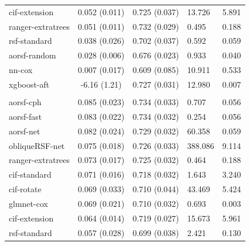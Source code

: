 \documentclass[twoside,11pt]{article}\usepackage[]{graphicx}\usepackage[]{xcolor}
\newenvironment{knitrout}{}{} %
\begin{document}
\begin{knitrout}
\begin{longtable}[t]{lcclc}
\hspace{1em}cif-extension & 0.052 (0.011) & 0.725 (0.037) & 13.726 & 5.891\\
\hspace{1em}ranger-extratrees & 0.051 (0.011) & 0.732 (0.029) & 0.495 & 0.188\\
\hspace{1em}rsf-standard & 0.038 (0.026) & 0.702 (0.037) & 0.592 & 0.059\\
\hspace{1em}aorsf-random & 0.028 (0.006) & 0.676 (0.023) & 0.933 & 0.040\\
\hspace{1em}nn-cox & 0.007 (0.017) & 0.609 (0.085) & 10.911 & 0.533\\
\hspace{1em}xgboost-aft & -6.16 (1.21) & 0.727 (0.031) & 12.980 & 0.007\\
\addlinespace[0.3em]
\hline
\multicolumn{5}{l}{\textit{\textbf{GUIDE-IT; HF hospitalization, n = 894, p = 59}}}\\
\hline
\hspace{1em}aorsf-cph & 0.085 (0.023) & 0.734 (0.033) & 0.707 & 0.056\\
\hspace{1em}aorsf-fast & 0.083 (0.022) & 0.734 (0.032) & 0.254 & 0.056\\
\hspace{1em}aorsf-net & 0.082 (0.024) & 0.729 (0.032) & 60.358 & 0.059\\
\hspace{1em}obliqueRSF-net & 0.075 (0.018) & 0.726 (0.033) & 388.086 & 9.114\\
\hspace{1em}ranger-extratrees & 0.073 (0.017) & 0.725 (0.032) & 0.464 & 0.188\\
\hspace{1em}cif-standard & 0.071 (0.016) & 0.718 (0.032) & 1.643 & 3.240\\
\hspace{1em}cif-rotate & 0.069 (0.033) & 0.710 (0.044) & 43.469 & 5.424\\
\hspace{1em}glmnet-cox & 0.069 (0.021) & 0.710 (0.032) & 0.693 & 0.003\\
\hspace{1em}cif-extension & 0.064 (0.014) & 0.719 (0.027) & 15.673 & 5.961\\
\hspace{1em}rsf-standard & 0.057 (0.028) & 0.699 (0.038) & 2.421 & 0.130\\

\end{longtable}
\end{knitrout}
\end{document}
